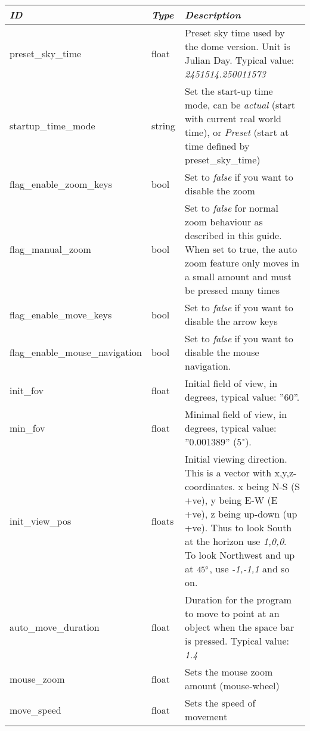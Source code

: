 \begin{longtabu} to \textwidth {l|l|X}\toprule
\emph{ID}              & \emph{Type} & \emph{Description}\\\midrule
preset\_sky\_time               & float  & Preset sky time used by the dome version. Unit is Julian Day. Typical value: \emph{2451514.250011573}\\\midrule
startup\_time\_mode             & string & Set the start-up time mode, can be \emph{actual} (start with current real world time), 
                                           or \emph{Preset} (start at time defined by preset\_sky\_time)\\\midrule
flag\_enable\_zoom\_keys        & bool   & Set to \emph{false} if you want to disable the zoom\\\midrule
flag\_manual\_zoom              & bool   & Set to \emph{false} for normal zoom behaviour as described in this guide. 
                                           When set to true, the auto zoom feature only moves in a small amount and must be pressed many times\\\midrule
flag\_enable\_move\_keys        & bool   & Set to \emph{false} if you want to disable the arrow keys\\\midrule
flag\_enable\_mouse\_navigation & bool   & Set to \emph{false} if you want to disable the mouse navigation.\\\midrule
init\_fov                       & float  & Initial field of view, in degrees, typical value: ''60''.\\\midrule
min\_fov                        & float  & Minimal field of view, in degrees, typical value: ''0.001389'' (5").\\\midrule
init\_view\_pos                 & floats & Initial viewing direction. This is a vector with x,y,z-coordinates. x being N-S (S +ve), 
                                           y being E-W (E +ve), z being up-down (up +ve). Thus to look South at the horizon use \emph{1,0,0}. 
                                           To look Northwest and up at $45\degree$, use \emph{-1,-1,1} and so on.\\\midrule
auto\_move\_duration            & float  & Duration for the program to move to point at an object when the space bar is pressed. Typical value: \emph{1.4}\\\midrule
mouse\_zoom                     & float  & Sets the mouse zoom amount (mouse-wheel)\\\midrule
move\_speed                     & float  & Sets the speed of movement\\\midrule

\end{longtabu}
